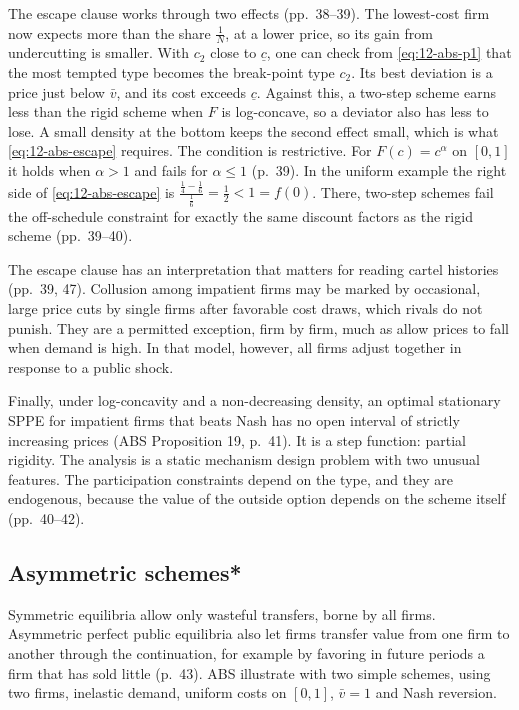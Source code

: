 The escape clause works through two effects (pp.~38--39). The lowest-cost firm now expects more than the share
$\frac{1}{N}$, at a lower price, so its gain from undercutting is smaller. With $c_2$ close to $\underline c$, one can
check from \eqref{eq:12-abs-p1} that the most tempted type becomes the break-point type $c_2$. Its best deviation is
a price just below $\bar v$, and its cost exceeds $\underline c$. Against this, a two-step scheme
earns less than the rigid scheme when $F$ is log-concave, so a deviator also has less to lose. A small density at the
bottom keeps the second effect small, which is what \eqref{eq:12-abs-escape} requires. The condition is restrictive.
For $F(c) = c^\alpha$ on $[0,1]$ it holds when $\alpha > 1$ and fails for $\alpha \le 1$ (p.~39). In the uniform
example the right side of \eqref{eq:12-abs-escape} is $\frac{\frac{1}{4} - \frac{1}{6}}{\frac{1}{6}} = \frac{1}{2} <
1 = f(0)$. There, two-step schemes fail the off-schedule constraint for exactly the same discount factors as the rigid
scheme (pp.~39--40).

The escape clause has an interpretation that matters for reading cartel histories (pp.~39, 47). Collusion among
impatient firms may be marked by occasional, large price cuts by single firms after favorable cost draws, which rivals
do not punish. They are a permitted exception, firm by firm, much as \citet{RotembergSaloner1986} allow prices to
fall when demand is high. In that model, however, all firms adjust together in response to a public shock.

Finally, under log-concavity and a non-decreasing density, an optimal stationary SPPE for impatient firms that beats
Nash has no open interval of strictly increasing prices (ABS Proposition 19, p.~41). It is a step function: partial
rigidity. The analysis is a static mechanism design problem with two unusual features. The participation constraints
depend on the type, and they are endogenous, because the value of the outside option depends on the scheme itself
(pp.~40--42).

\subsection{Asymmetric schemes*}\label{sec:12-abs-asymmetric}

Symmetric equilibria allow only wasteful transfers, borne by all firms. Asymmetric perfect public equilibria also let
firms transfer value from one firm to another through the continuation, for example by favoring in future periods a
firm that has sold little (p.~43). ABS illustrate with two simple schemes, using two firms, inelastic demand, uniform
costs on $[0,1]$, $\bar v = 1$ and Nash reversion.


